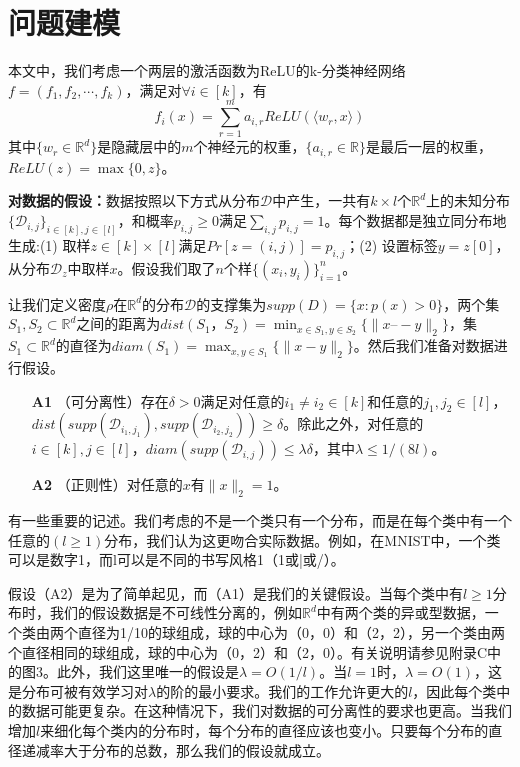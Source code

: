 \section{问题建模}
本文中，我们考虑一个两层的激活函数为ReLU的k-分类神经网络$f = (f_1,f_2,\cdots,f_k)$，满足对$\forall i \in [k]$，有
\[
f_i(x) = \sum_{r = 1}^m a_{i,r} ReLU(\langle w_r, x\rangle)
\]
其中$\{w_r\in \mathbb{R}^d\}$是隐藏层中的$m$个神经元的权重，$\{a_{i,r}\in \mathbb{R}\}$是最后一层的权重，$ReLU(z) = \max\{0,z\}$。
\par
\textbf{对数据的假设：}数据按照以下方式从分布$\mathcal{D}$中产生，一共有$k\times l$个$\mathbb{R}^d$上的未知分布$\{\mathcal{D}_{i,j}\}_{i\in [k] ,j \in [l]}$，和概率$p_{i,j}\geq 0$满足$\sum_{i,j}p_{i,j} = 1$。每个数据都是独立同分布地生成:(1) 取样$z\in [k]\times [l]$满足$Pr[z = (i,j)] = p_{i,j}$；(2) 设置标签$y = z[0]$，从分布$\mathcal{D}_z$中取样$x$。假设我们取了$n$个样$\{(x_i,y_i)\}_{i=1}^n$。
\par
让我们定义密度$\rho$在$\mathbb{R}^d$的分布$\mathcal{D}$的支撑集为$supp(D) = \{x:p(x)>0\}$，两个集$S_1,S_2\subset \mathbb{R}^d$之间的距离为$dist(S_1，S_2)= \min_{x\in S_1,y\in S_2}\{\|x–-y\|_2\}$，集$S_1\subset \mathbb{R}^d$的直径为$diam(S_1) = \max_{x,y\in S_1}\{\|x-y\|_2\}$。然后我们准备对数据进行假设。
\begin{itemize}
  \item[\textbf{A1}] （可分离性）存在$\delta >0$满足对任意的$i_1\neq i_2\in[k]$和任意的$j_1,j_2\in[l]$，$dist(supp(\mathcal{D}_{i_1,j_1}), supp(\mathcal{D}_{i_2,j_2}))\geq \delta$。除此之外，对任意的$i\in [k],j\in [l]$，$diam(supp(\mathcal{D}_{i,j}))\leq \lambda \delta$，其中$\lambda \leq 1/(8l)$。
  \item[\textbf{A2}] （正则性）对任意的$x$有$\|x\|_2 = 1$。
\end{itemize}
\par
有一些重要的记述。我们考虑的不是一个类只有一个分布，而是在每个类中有一个任意的$(l\geq 1)$分布，我们认为这更吻合实际数据。例如，在MNIST中，一个类可以是数字1，而l可以是不同的书写风格1（1或|或/）。
\par
假设（A2）是为了简单起见，而（A1）是我们的关键假设。当每个类中有$l \geq 1$分布时，我们的假设数据是不可线性分离的，例如$\mathbb{R}^d$中有两个类的异或型数据，一个类由两个直径为1/10的球组成，球的中心为（0，0）和（2，2），另一个类由两个直径相同的球组成，球的中心为（0，2）和（2，0）。有关说明请参见附录C中的图3。此外，我们这里唯一的假设是$\lambda = O(1/l)$。当$l=1$时，$\lambda = O(1)$，这是分布可被有效学习对$\lambda$的阶的最小要求。我们的工作允许更大的$l$，因此每个类中的数据可能更复杂。在这种情况下，我们对数据的可分离性的要求也更高。当我们增加$l$来细化每个类内的分布时，每个分布的直径应该也变小。只要每个分布的直径递减率大于分布的总数，那么我们的假设就成立。
